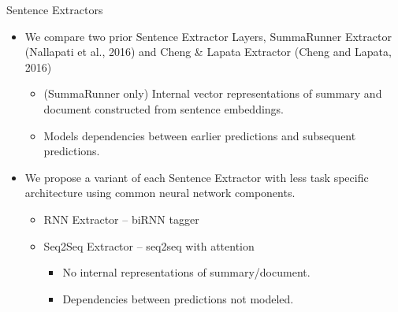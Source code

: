 \begin{frame}{Sentence Extractors}
  \begin{itemize}
        \item We compare two prior Sentence Extractor Layers,
                SummaRunner Extractor {\tiny (Nallapati et al., 2016)}
                and  Cheng \& Lapata Extractor {\tiny(Cheng and Lapata, 2016)}
                \begin{itemize}
                    \item (SummaRunner only) Internal vector representations of summary and document constructed from sentence embeddings.
                    \item Models dependencies between earlier predictions
                        and subsequent predictions.
                \end{itemize}
            \vspace{10pt}
       \item<2> We propose a variant of each Sentence Extractor with less task 
           specific architecture using common neural network components.
            \begin{itemize}
                \item RNN Extractor -- biRNN tagger
                \item Seq2Seq Extractor -- seq2seq with attention
                \begin{itemize}
                    \item No internal representations of summary/document.
                    \item Dependencies between predictions not modeled.
            \end{itemize}
            \end{itemize}
    \end{itemize}

\end{frame}
